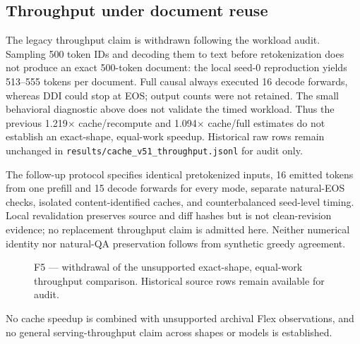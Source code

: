 \subsection{Throughput under document reuse}
\label{sec:results-caching-throughput}

The legacy throughput claim is withdrawn following the workload audit.
Sampling 500 token IDs and decoding them to text before retokenization does
not produce an exact 500-token document: the local seed-0 reproduction yields
513--555 tokens per document. Full causal always executed 16 decode forwards,
whereas DDI could stop at EOS; output counts were not retained. The small
behavioral diagnostic above does not validate the timed workload. Thus the
previous 1.219$\times$ cache/recompute and 1.094$\times$ cache/full estimates
do not establish an exact-shape, equal-work speedup. Historical raw rows remain
unchanged in
\texttt{results/cache\_v51\_throughput.jsonl} for audit only.

The follow-up protocol specifies identical pretokenized inputs, 16 emitted tokens from one prefill
and 15 decode forwards for every mode, separate natural-EOS checks, isolated
content-identified caches, and counterbalanced seed-level timing. Local
revalidation preserves source and diff hashes but is not clean-revision
evidence; no replacement throughput claim is admitted here. Neither numerical
identity nor natural-QA preservation follows from synthetic greedy agreement.

\begin{figure}[t]
    \centering
    
    \caption{F5 --- withdrawal of the unsupported exact-shape, equal-work
        throughput comparison. Historical source rows remain available for audit.}
    \label{fig:f5}
\end{figure}

No cache speedup is combined with unsupported archival Flex observations, and
no general serving-throughput claim across shapes or models is established.
